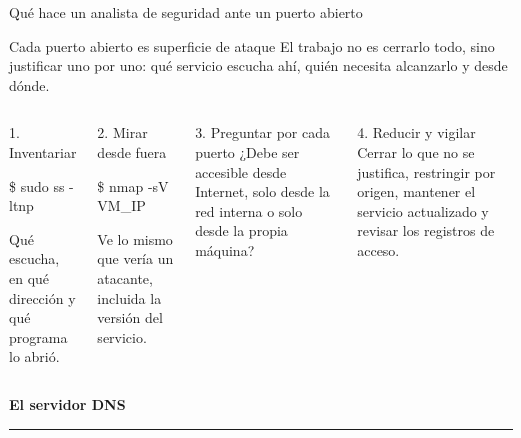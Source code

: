 \documentclass[aspectratio=169,10pt,c]{beamer}
\begin{document}
\begin{frame}{Qué hace un analista de seguridad ante un puerto abierto}
\begin{block}{Cada puerto abierto es superficie de ataque}
\small El trabajo no es cerrarlo todo, sino justificar uno por uno: qué servicio escucha ahí, quién necesita alcanzarlo y desde dónde.
\end{block}
\begin{columns}[T,onlytextwidth]
\begin{exampleblock}{1. Inventariar}
\begin{terminal}\footnotesize
\$ sudo ss -ltnp
\end{terminal}
\small Qué escucha, en qué dirección y qué programa lo abrió.
\end{exampleblock}
\begin{exampleblock}{2. Mirar desde fuera}
\begin{terminal}\footnotesize
\$ nmap -sV VM\_IP
\end{terminal}
\small Ve lo mismo que vería un atacante, incluida la versión del servicio.
\end{exampleblock}
\begin{exampleblock}{3. Preguntar por cada puerto}
\small ¿Debe ser accesible desde Internet, solo desde la red interna o solo desde la propia máquina?
\end{exampleblock}
\begin{exampleblock}{4. Reducir y vigilar}
\small Cerrar lo que no se justifica, restringir por origen, mantener el servicio actualizado y revisar los registros de acceso.
\end{exampleblock}
\end{columns}
\end{frame}

\begin{frame}[plain]
\vfill
\begin{center}
{\fontsize{29}{34}\selectfont\bfseries El servidor DNS}\par
\vspace{4mm}
{\color{utpRojo}\rule{8.5cm}{1.2pt}}
\end{center}
\vfill
\end{frame}
\end{document}

